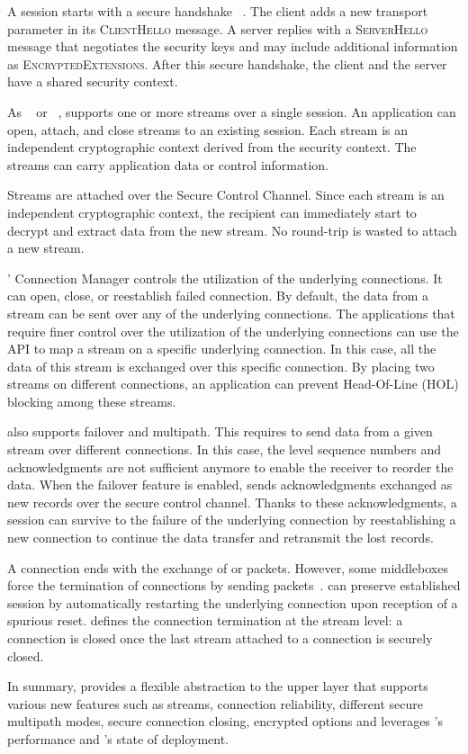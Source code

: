 A \tcpls session starts with a secure  handshake ~\cite{rfc8446}. The
client adds a new \tcpls transport parameter in its \textsc{ClientHello}
message. A \tcpls server replies with a \textsc{ServerHello} message that
negotiates the security keys and may include additional \tcpls information as
\textsc{EncryptedExtensions}. After this secure handshake, the client and the
server have a shared security context.

As \sctp~\cite{rfc4960} or \quic~\cite{draft-ietf-quic-transport}, \tcpls
supports one or more streams over a single \tcpls session. An application can
open, attach, and close streams to an existing \tcpls session. Each stream is an
independent cryptographic context derived from the \tcpls security context. The
\tcpls streams can carry application data or control information.


Streams are attached over the Secure Control Channel. Since each stream is an
independent cryptographic context, the recipient can immediately start to
decrypt and extract data from the new stream. No round-trip is wasted to attach
a new stream.

\tcpls' Connection Manager controls the utilization of the underlying \tcp
connections. It can open, close, or reestablish failed \tcp connection. By
default, the data from a stream can be sent over any of the underlying \tcp
connections. The applications that require finer control over the utilization of
the underlying \tcp connections can use the \tcpls API to map a stream on a
specific underlying connection. In this case, all the data of this stream is
exchanged over this specific connection. By placing two streams on different
connections, an application can prevent Head-Of-Line (HOL) blocking among these
streams.

\tcpls also supports failover and multipath. This requires to send data from a
given stream over different \tcp connections. In this case, the \tcp level
sequence numbers and acknowledgments are not sufficient anymore to enable the
receiver to reorder the data. When the failover feature is enabled, \tcpls sends
acknowledgments exchanged as new \tls records over the secure control channel.
Thanks to these \tcpls acknowledgments, a \tcpls session can survive to the
failure of the underlying \tcp connection by reestablishing a new \tcp
connection to continue the data transfer and retransmit the lost records.

A \tcp connection ends with the exchange of \fin or \rst packets. However, some
middleboxes force the termination of \tcp connections by sending \rst
packets~\cite{rfc3360,weaver2009detecting}. \tcpls can preserve established
session by automatically restarting the underlying \tcp connection upon
reception of a spurious reset. \tcpls defines the connection termination at the
stream level: a \tcp connection is closed once the last stream attached to a
\tcp connection is securely closed.

In summary, \tcpls provides a flexible abstraction to the
upper layer that supports various new features such as streams, connection
reliability, different secure multipath modes, secure connection closing,
encrypted \tcp options and leverages \tcp's performance and \tls's state of
deployment.

